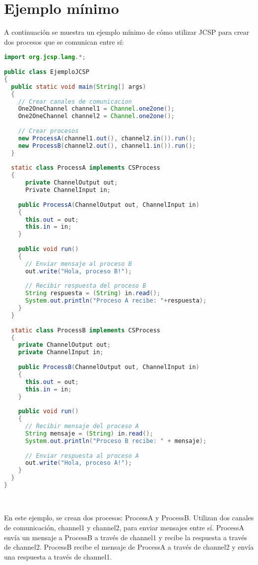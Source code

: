 \section*{Ejemplo mínimo}
A continuación se muestra un ejemplo mínimo de cómo utilizar JCSP para crear dos procesos que se comunican entre sí:
\begin{lstlisting}[language=Java, frame=single]
import org.jcsp.lang.*;
	
public class EjemploJCSP
{
  public static void main(String[] args)
  {
    // Crear canales de comunicacion
	One2OneChannel channel1 = Channel.one2one();
	One2OneChannel channel2 = Channel.one2one();
					
	// Crear procesos
	new ProcessA(channel1.out(), channel2.in()).run();
	new ProcessB(channel2.out(), channel1.in()).run();
  }
			
  static class ProcessA implements CSProcess
  {
      private ChannelOutput out;
	  Private ChannelInput in;
				
    public ProcessA(ChannelOutput out, ChannelInput in)
    {
      this.out = out;
	  this.in = in;
    }
				
    public void run()
    {
      // Enviar mensaje al proceso B
	  out.write("Hola, proceso B!");
					
      // Recibir respuesta del proceso B
      String respuesta = (String) in.read();
      System.out.println("Proceso A recibe: "+respuesta);
    }
  }
			
  static class ProcessB implements CSProcess
  {
    private ChannelOutput out;
	private ChannelInput in;
				
	public ProcessB(ChannelOutput out, ChannelInput in)
	{
	  this.out = out;
	  this.in = in;
	}
				
	public void run()
	{
	  // Recibir mensaje del proceso A
	  String mensaje = (String) in.read();
	  System.out.println("Proceso B recibe: " + mensaje);
			
	  // Enviar respuesta al proceso A
	  out.write("Hola, proceso A!");
	}
  }
}
	
\end{lstlisting}
\\
En este ejemplo, se crean dos procesos: ProcessA y ProcessB. Utilizan dos canales de comunicación, channel1 y channel2, para enviar mensajes entre sí. ProcessA envía un mensaje a ProcessB a través de channel1 y recibe la respuesta a través de channel2. ProcessB recibe el mensaje de ProcessA a través de channel2 y envía una respuesta a través de channel1.

